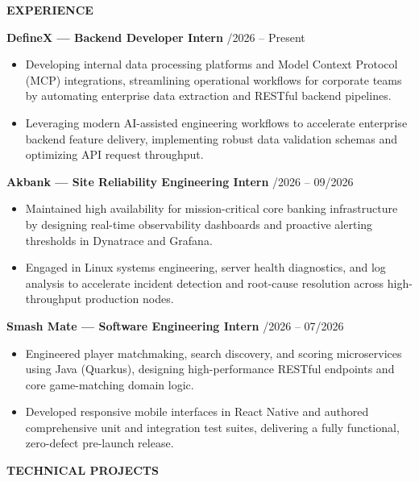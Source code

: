 \documentclass[a4paper]{article}
\newcommand{\sechead}[1]{%
    \vspace{7.5pt}%
    {\centering\fontsize{11}{13}\textbf{\MakeUppercase{#1}}\par}%
    \vspace{3.5pt}%
}
\newcommand{\entry}[2]{%
    {\fontsize{10.5}{13}\textbf{#1}} \hfill {\fontsize{9.5}{12.5}\selectfont #2} \par
}
\newcommand{\desc}[1]{%
    {\fontsize{9.5}{12.5}\selectfont #1}%
}
\begin{document}
\sechead{Experience}

\entry{DefineX \textnormal{--- Backend Developer Intern}}{09/2026 -- Present}
\begin{itemize}[leftmargin=1.1em, itemsep=1.2pt, parsep=0pt, topsep=1.8pt]
   \item \desc{Developing internal data processing platforms and Model Context Protocol (MCP) integrations, streamlining operational workflows for corporate teams by automating enterprise data extraction and RESTful backend pipelines.}
   \item \desc{Leveraging modern AI-assisted engineering workflows to accelerate enterprise backend feature delivery, implementing robust data validation schemas and optimizing API request throughput.}
\end{itemize}
\vspace{2.5pt}

\entry{Akbank \textnormal{--- Site Reliability Engineering Intern}}{07/2026 -- 09/2026}
\begin{itemize}[leftmargin=1.1em, itemsep=1.2pt, parsep=0pt, topsep=1.8pt]
   \item \desc{Maintained high availability for mission-critical core banking infrastructure by designing real-time observability dashboards and proactive alerting thresholds in Dynatrace and Grafana.}
   \item \desc{Engaged in Linux systems engineering, server health diagnostics, and log analysis to accelerate incident detection and root-cause resolution across high-throughput production nodes.}
\end{itemize}
\vspace{2.5pt}

\entry{Smash Mate \textnormal{--- Software Engineering Intern}}{06/2026 -- 07/2026}
\begin{itemize}[leftmargin=1.1em, itemsep=1.2pt, parsep=0pt, topsep=1.8pt]
   \item \desc{Engineered player matchmaking, search discovery, and scoring microservices using Java (Quarkus), designing high-performance RESTful endpoints and core game-matching domain logic.}
   \item \desc{Developed responsive mobile interfaces in React Native and authored comprehensive unit and integration test suites, delivering a fully functional, zero-defect pre-launch release.}
\end{itemize}

\sechead{Technical Projects}
\end{document}
